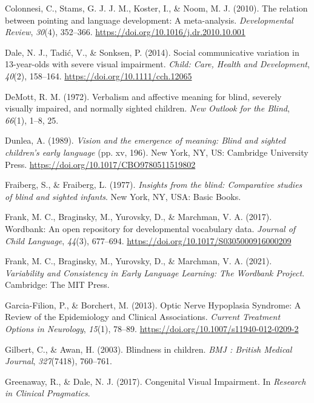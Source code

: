 \documentclass[english,man,floatsintext]{apa6}
\begin{document}
\leavevmode\hypertarget{ref-colonnesi2010}{}%
Colonnesi, C., Stams, G. J. J. M., Koster, I., \& Noom, M. J. (2010). The relation between pointing and language development: A meta-analysis. \emph{Developmental Review}, \emph{30}(4), 352--366. \url{https://doi.org/10.1016/j.dr.2010.10.001}

\leavevmode\hypertarget{ref-dale2014}{}%
Dale, N. J., Tadić, V., \& Sonksen, P. (2014). Social communicative variation in 13-year-olds with severe visual impairment. \emph{Child: Care, Health and Development}, \emph{40}(2), 158--164. \url{https://doi.org/10.1111/cch.12065}

\leavevmode\hypertarget{ref-demott1972}{}%
DeMott, R. M. (1972). Verbalism and affective meaning for blind, severely visually impaired, and normally sighted children. \emph{New Outlook for the Blind}, \emph{66}(1), 1--8, 25.

\leavevmode\hypertarget{ref-dunlea1989}{}%
Dunlea, A. (1989). \emph{Vision and the emergence of meaning: Blind and sighted children's early language} (pp. xv, 196). New York, NY, US: Cambridge University Press. \url{https://doi.org/10.1017/CBO9780511519802}

\leavevmode\hypertarget{ref-fraiberg1977}{}%
Fraiberg, S., \& Fraiberg, L. (1977). \emph{Insights from the blind: Comparative studies of blind and sighted infants}. New York, NY, USA: Basic Books.

\leavevmode\hypertarget{ref-frank2017}{}%
Frank, M. C., Braginsky, M., Yurovsky, D., \& Marchman, V. A. (2017). Wordbank: An open repository for developmental vocabulary data. \emph{Journal of Child Language}, \emph{44}(3), 677--694. \url{https://doi.org/10.1017/S0305000916000209}

\leavevmode\hypertarget{ref-frank2021}{}%
Frank, M. C., Braginsky, M., Yurovsky, D., \& Marchman, V. A. (2021). \emph{Variability and Consistency in Early Language Learning: The Wordbank Project}. Cambridge: The MIT Press.

\leavevmode\hypertarget{ref-garcia-filion2013}{}%
Garcia-Filion, P., \& Borchert, M. (2013). Optic Nerve Hypoplasia Syndrome: A Review of the Epidemiology and Clinical Associations. \emph{Current Treatment Options in Neurology}, \emph{15}(1), 78--89. \url{https://doi.org/10.1007/s11940-012-0209-2}

\leavevmode\hypertarget{ref-gilbert2003}{}%
Gilbert, C., \& Awan, H. (2003). Blindness in children. \emph{BMJ : British Medical Journal}, \emph{327}(7418), 760--761.

\leavevmode\hypertarget{ref-greenaway2017}{}%
Greenaway, R., \& Dale, N. J. (2017). Congenital Visual Impairment. In \emph{Research in Clinical Pragmatics}.
\end{document}
